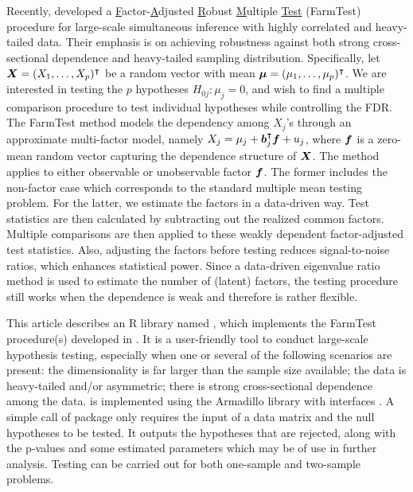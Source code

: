 Recently, \cite{FKSZ2017} developed a \underline{F}actor-\underline{A}djusted \underline{R}obust \underline{M}ultiple \underline{Test} (FarmTest) procedure for large-scale simultaneous inference with highly correlated and heavy-tailed data. Their emphasis is on achieving robustness against both strong cross-sectional dependence and heavy-tailed sampling distribution.
Specifically, let $\bm{X} =(X_1, \ldots , X_p)^\intercal$ be a random vector with mean $\bm{\mu}= (\mu_1,\ldots, \mu_p)^\intercal$. We are interested in testing the $p$ hypotheses $H_{0j} : \mu_j = 0$, and wish to find a multiple comparison procedure to test individual hypotheses while controlling the FDR. The FarmTest method models the dependency among $X_j$'s through an approximate multi-factor model, namely $X_j = \mu_j + \bm{b}_j^\intercal \bm f + u_j$, where $\bm f$ is a zero-mean random vector capturing the dependence structure of $\bm{X}$. The method applies to either observable or unobservable factor $\bm f$. 
The former includes the non-factor case which corresponds to the standard multiple mean testing problem. For the latter, we estimate the factors in a data-driven way.  Test statistics are then calculated by subtracting out the realized common factors. Multiple comparisons are then applied to these weakly dependent factor-adjusted test statistics. Also, adjusting the factors before testing reduces signal-to-noise ratios, which enhances statistical power.
Since a data-driven eigenvalue ratio method is used to estimate the number of (latent) factors, the testing procedure still works when the dependence is weak and therefore is rather flexible.   

This article describes an R library named , which implements the FarmTest procedure(s) developed in \cite{FKSZ2017}.
It is a user-friendly tool to conduct large-scale hypothesis testing, especially when one or several of the following scenarios are present: the dimensionality is far larger than the sample size available; the data is heavy-tailed and/or asymmetric; there is strong cross-sectional dependence among the data. 
 is implemented using the Armadillo library \citep{SC2016} with  interfaces \citep{EF2011, ES2014}.
A simple call of  package only requires the input of a data matrix and the null hypotheses to be tested. It outputs the hypotheses that are rejected, along with the p-values and some estimated parameters which may be of use in further analysis. Testing can be carried out for both one-sample and two-sample problems.




